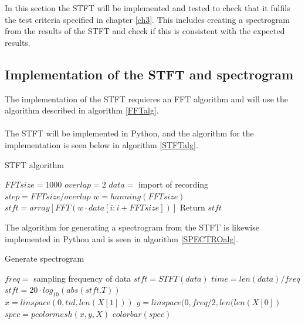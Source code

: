 In this section the STFT will be implemented and tested to check that it fulfils the test criteria specified in chapter \ref{ch3}. This includes creating a spectrogram from the results of the STFT and check if this is consistent with the expected results.

\subsection{Implementation of the STFT and spectrogram}
The implementation of the STFT requieres an FFT algorithm and will use the algorithm described in algorithm \ref{FFTalg}.
\\ \\
The STFT will be implemented in Python, and the algorithm for the implementation is seen below in algorithm \ref{STFTalg}.
\begin{algorithm}[H]
\caption{STFT algorithm}
\label{STFTalg}
\begin{algorithmic}[1]
\State $FFTsize=1000$ 
\State $overlap=2$ 
\State $data=$ import of recording \\
\State $step=FFTsize/overlap$
\State $w=hanning(FFTsize)$ 
\State $stft = array[FFT(w\cdot data[i:i+FFTsize])]$
\EndFor
\State Return $stft$
\EndProcedure
\end{algorithmic}
\end{algorithm}

The algorithm for generating a spectrogram from the STFT is likewise implemented in Python and is seen in algorithm \ref{SPECTROalg}.
\begin{algorithm}[H]
\caption{Generate spectrogram}
\label{SPECTROalg}
\begin{algorithmic}[1]
\State $freq=$ sampling frequency of data
\State $stft=STFT(data)$ 
\State $time=len(data)/freq$ 
\State $stft=20\cdot log_{10}(abs(stft.T))$ \\
\State $x=linspace(0,tid,len(X[1]))$ 
\State $y=linspace(0,freq/2,len(len(X[0])$ \\
\State $spec=pcolormesh(x,y,X)$ 
\State $colorbar(spec)$ 
\end{algorithmic}
\end{algorithm}

